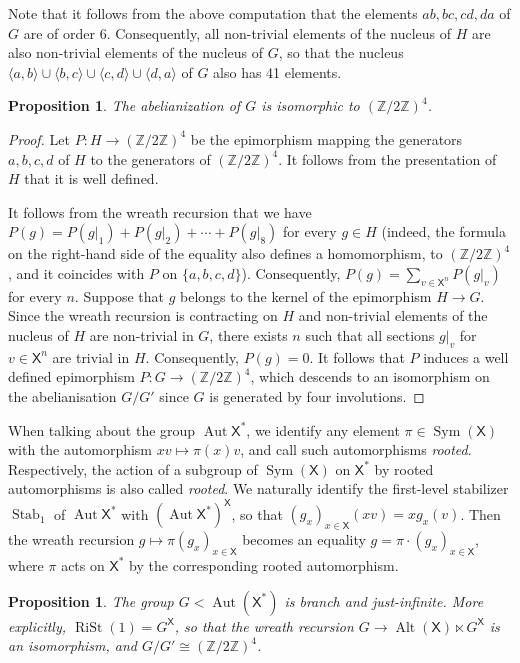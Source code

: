 \documentclass[11pt]{amsart}
\newcommand{\Z}{\ensuremath{\mathbb{Z}}}%
\newcommand{\arr}{\longrightarrow}
\newcommand{\xs}{\alb^\ast}
\newcommand{\Sym}{\mathop{\mathrm{Sym}}\nolimits}
\newcommand{\Alt}{\mathop{\mathrm{Alt}}\nolimits}
\newcommand{\stab}{\ensuremath{\operatorname{Stab}}}%
\newcommand{\aut}{\ensuremath{\operatorname{Aut}}}%
\newcommand{\rist}{\ensuremath{\operatorname{RiSt}}}%
\newcommand{\alb}{\ensuremath{\mathsf{X}}}%
\theoremstyle{definition}
\theoremstyle{plain}
\newtheorem{main thm}{Theorem}
\newtheorem{prop}[defin]{Proposition}
\theoremstyle{remark}
\theoremstyle{plain}
\begin{document}
Note that it follows from the above computation that the elements $ab, bc, cd, da$ of $G$ are of order $6$. Consequently, all non-trivial elements of the nucleus of $H$ are also non-trivial elements of the nucleus of $G$, so that the nucleus $\langle a, b\rangle\cup\langle b, c\rangle\cup\langle c, d\rangle\cup\langle d, a\rangle$ of $G$ also has 41 elements.

\begin{prop}
    The abelianization of $G$ is isomorphic to $(\Z/2\Z)^4$.
\end{prop}

\begin{proof}
Let $P\colon H\arr (\Z/2\Z)^4$ be the epimorphism mapping the generators $a, b, c, d$ of $H$ to the generators of $(\Z/2\Z)^4$. It follows from the presentation of $H$ that it is well defined.

It follows from the wreath recursion that we have $P(g)=P(g|_1)+P(g|_2)+\cdots+P(g|_8)$ for every $g\in H$ (indeed, the formula on the right-hand side of the equality also defines a homomorphism, to $(\Z/2\Z)^4$, and it coincides with $P$ on $\{a, b, c, d\}$). 
Consequently, $P(g)=\sum_{v\in\alb^n} P(g|_v)$ for every $n$. Suppose that $g$ belongs to the kernel of the epimorphism $H\arr G$. Since the wreath recursion is contracting on $H$ and non-trivial elements of the nucleus of $H$ are non-trivial in $G$, there exists $n$ such that all sections $g|_v$ for $v\in\alb^n$ are trivial in $H$. Consequently, $P(g)=0$. It follows that $P$ induces a well defined epimorphism $P\colon G\arr (\Z/2\Z)^4$, which descends to an isomorphism on the abelianisation $G/G'$ since $G$ is generated by four involutions.
\end{proof}

When talking about the group $\aut\xs$, we identify any element $\pi\in\Sym(\alb)$ with the automorphism $xv\mapsto \pi(x)v$, and call such automorphisms \emph{rooted}. Respectively, the action of a subgroup of $\Sym(\alb)$ on $\xs$ by rooted automorphisms is also called \emph{rooted}. We naturally identify the first-level stabilizer $\stab_1$ of $\aut\xs$ with $(\aut\xs)^\alb$, so that $(g_x)_{x\in\alb}(xv)=xg_x(v)$. Then the wreath recursion $g\mapsto\pi(g_x)_{x\in\alb}$ becomes an equality $g=\pi\cdot(g_x)_{x\in\alb}$, where $\pi$ acts on $\xs$ by the corresponding rooted automorphism.


\begin{prop} \label{pr:sierpinskibranch}
    The group  $G<\aut(\xs)$ is branch and just-infinite. More explicitly, $\rist(1)=G^\alb$, so that the wreath recursion $G\arr\Alt(\alb)\ltimes G^\alb$ is an isomorphism, and $G/G'\cong (\Z/2\Z)^4$.
\end{prop}
\end{document}
